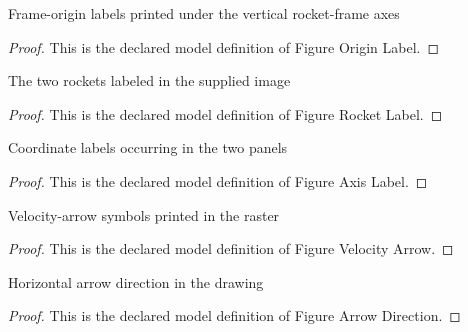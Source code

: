 \begin{definition}
  \label{def:physics:phyx-mini-0565:phyxminiproblems-problemphyxmini0565-figureoriginlabel}
  Frame-origin labels printed under the vertical rocket-frame axes
\end{definition}
\begin{proof}
  This is the declared model definition of Figure Origin Label.
\end{proof}
\begin{definition}
  \label{def:physics:phyx-mini-0565:phyxminiproblems-problemphyxmini0565-figurerocketlabel}
  The two rockets labeled in the supplied image
\end{definition}
\begin{proof}
  This is the declared model definition of Figure Rocket Label.
\end{proof}
\begin{definition}
  \label{def:physics:phyx-mini-0565:phyxminiproblems-problemphyxmini0565-figureaxislabel}
  Coordinate labels occurring in the two panels
\end{definition}
\begin{proof}
  This is the declared model definition of Figure Axis Label.
\end{proof}
\begin{definition}
  \label{def:physics:phyx-mini-0565:phyxminiproblems-problemphyxmini0565-figurevelocityarrow}
  Velocity-arrow symbols printed in the raster
\end{definition}
\begin{proof}
  This is the declared model definition of Figure Velocity Arrow.
\end{proof}
\begin{definition}
  \label{def:physics:phyx-mini-0565:phyxminiproblems-problemphyxmini0565-figurearrowdirection}
  Horizontal arrow direction in the drawing
\end{definition}
\begin{proof}
  This is the declared model definition of Figure Arrow Direction.
\end{proof}

